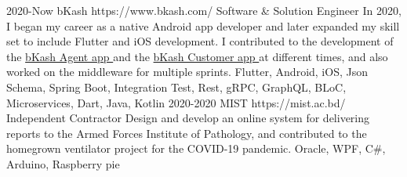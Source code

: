 
\horizontalLineRight

\listItemOne
    {2020-Now}
    {bKash}
    {https://www.bkash.com/}
    {Software \& Solution Engineer}
    {In 2020, I began my career as a native Android app developer and later expanded my skill set to include Flutter and iOS development.
    I contributed to the development of the \href{https://play.google.com/store/apps/details?id=com.bkash.businessapp}{bKash Agent app  \linkIcon} and
    the \href{https://play.google.com/store/apps/details?id=com.bKash.customerapp}{bKash Customer app \linkIcon} at different times,
    and also worked on the middleware for multiple sprints.}
    {Flutter, Android, iOS, Json Schema, Spring Boot, Integration Test, Rest, gRPC, GraphQL, BLoC, Microservices, Dart, Java, Kotlin}
\listItemOne
    {2020-2020}
    {MIST}
    {https://mist.ac.bd/}
    {Independent Contractor}
    {Design and develop an online system for delivering reports to the Armed Forces Institute of Pathology,
        and contributed to the homegrown ventilator project for the COVID-19 pandemic.}
    {Oracle, WPF, C\#, Arduino, Raspberry pie}%